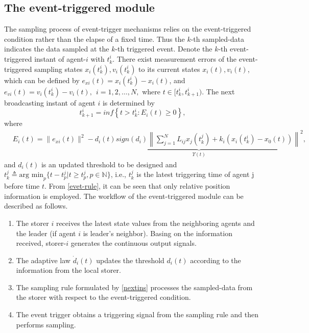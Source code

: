 \documentclass[review]{elsarticle}
\begin{document}
\subsection{The event-triggered module}
The sampling process of event-trigger mechanisms relies on the event-triggered condition rather than the elapse of a fixed time. Thus the $k$-th sampled-data indicates the data sampled at the $k$-th triggered event.
Denote the $k$-th event-triggered instant of agent-$i$ with $t_k^i$. There exist measurement errors of the event-triggered sampling states $x_i(t_k^i),v_i(t_k^i)$ to its current states $x_i(t),v_i(t)$, which can be defined by $e_{xi}(t) = x_i(t_k^i) -x_i(t)$, and $e_{vi}(t)= v_i(t_k^i) -v_i(t),~~i = 1,2,\ldots,N,$ where $t\in [t_k^i,t_{k+1}^i)$. The next broadcasting instant of agent $i$ is determined by 
\begin{equation}\label{nextins}
t_{k+1}^i = inf\left\lbrace t>t_{k}^i: E_i(t)\geq 0 \right\rbrace,
\end{equation}
where 
\begin{equation}\label{evet-rule}
\begin{split}
&E_i(t)=  \|e_{xi}(t)\|^2 - \underbrace{ d_i(t)sign(d_i)\left\| \sum_{j=1}^{N}L_{ij} x_j(t_k^j) + k_i \left( x_i(t_k^i) - x_0(t) \right)  \right\|^2 }_{\Upsilon(t)} ,
\end{split}
\end{equation} 
and $d_i(t)$ is an updated threshold to be designed and $t_k^j \triangleq \text{arg~min}_p \{t-t_p^j|t\geq t_p^j,p\in \mathbb{N}\}$, i.e., $t_k^j$ is the latest triggering time of agent j before time $t$.
From \eqref{evet-rule}, it can be seen that only relative position information is employed. The workflow of the event-triggered module can be described as follows.
\begin{enumerate}
	\item  The storer $i$ receives the latest state values from the neighboring agents and the leader (if agent $i$ is leader's neighbor). Basing on the information received, storer-$i$ generates the continuous output signals. 
	\item  The adaptive law $\dot d_i(t)$ updates the threshold $d_i(t)$ according to the information from the local storer.
	\item  The sampling rule formulated by \eqref{nextins} processes the sampled-data from the storer with respect to the event-triggered condition.
	\item  The event trigger obtains a triggering signal from the sampling rule and then performs sampling. 
\end{enumerate}
\end{document}
